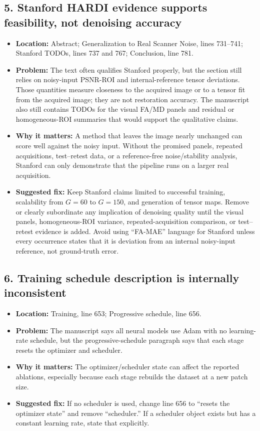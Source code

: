 \documentclass[11pt]{article}
\begin{document}
\subsection*{5. Stanford HARDI evidence supports feasibility, not denoising accuracy}
\begin{itemize}
  \item \textbf{Location:} Abstract; Generalization to Real Scanner Noise, lines 731--741; Stanford TODOs, lines 737 and 767; Conclusion, line 781.
  \item \textbf{Problem:} The text often qualifies Stanford properly, but the section still relies on noisy-input PSNR-ROI and internal-reference tensor deviations. Those quantities measure closeness to the acquired image or to a tensor fit from the acquired image; they are not restoration accuracy. The manuscript also still contains TODOs for the visual FA/MD panels and residual or homogeneous-ROI summaries that would support the qualitative claims.
  \item \textbf{Why it matters:} A method that leaves the image nearly unchanged can score well against the noisy input. Without the promised panels, repeated acquisitions, test--retest data, or a reference-free noise/stability analysis, Stanford can only demonstrate that the pipeline runs on a larger real acquisition.
  \item \textbf{Suggested fix:} Keep Stanford claims limited to successful training, scalability from $G=60$ to $G=150$, and generation of tensor maps. Remove or clearly subordinate any implication of denoising quality until the visual panels, homogeneous-ROI variance, repeated-acquisition comparison, or test--retest evidence is added. Avoid using ``FA-MAE'' language for Stanford unless every occurrence states that it is deviation from an internal noisy-input reference, not ground-truth error.
\end{itemize}

\subsection*{6. Training schedule description is internally inconsistent}
\begin{itemize}
  \item \textbf{Location:} Training, line 653; Progressive schedule, line 656.
  \item \textbf{Problem:} The manuscript says all neural models use Adam with no learning-rate schedule, but the progressive-schedule paragraph says that each stage resets the optimizer and scheduler.
  \item \textbf{Why it matters:} The optimizer/scheduler state can affect the reported ablations, especially because each stage rebuilds the dataset at a new patch size.
  \item \textbf{Suggested fix:} If no scheduler is used, change line 656 to ``resets the optimizer state'' and remove ``scheduler.'' If a scheduler object exists but has a constant learning rate, state that explicitly.
\end{itemize}
\end{document}
